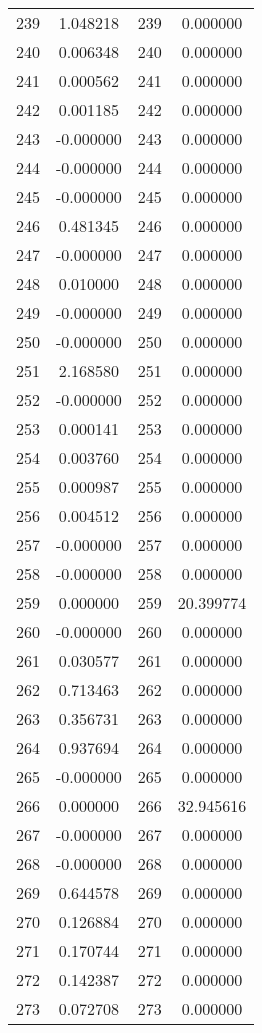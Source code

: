 \documentclass[12pt]{article}
\begin{document}
\begin{longtable}{@{}cccc@{}}
239 & 1.048218 & 239 & 0.000000 \\
240 & 0.006348 & 240 & 0.000000 \\
241 & 0.000562 & 241 & 0.000000 \\
242 & 0.001185 & 242 & 0.000000 \\
243 & -0.000000 & 243 & 0.000000 \\
244 & -0.000000 & 244 & 0.000000 \\
245 & -0.000000 & 245 & 0.000000 \\
246 & 0.481345 & 246 & 0.000000 \\
247 & -0.000000 & 247 & 0.000000 \\
248 & 0.010000 & 248 & 0.000000 \\
249 & -0.000000 & 249 & 0.000000 \\
250 & -0.000000 & 250 & 0.000000 \\
251 & 2.168580 & 251 & 0.000000 \\
252 & -0.000000 & 252 & 0.000000 \\
253 & 0.000141 & 253 & 0.000000 \\
254 & 0.003760 & 254 & 0.000000 \\
255 & 0.000987 & 255 & 0.000000 \\
256 & 0.004512 & 256 & 0.000000 \\
257 & -0.000000 & 257 & 0.000000 \\
258 & -0.000000 & 258 & 0.000000 \\
259 & 0.000000 & 259 & 20.399774 \\
260 & -0.000000 & 260 & 0.000000 \\
261 & 0.030577 & 261 & 0.000000 \\
262 & 0.713463 & 262 & 0.000000 \\
263 & 0.356731 & 263 & 0.000000 \\
264 & 0.937694 & 264 & 0.000000 \\
265 & -0.000000 & 265 & 0.000000 \\
266 & 0.000000 & 266 & 32.945616 \\
267 & -0.000000 & 267 & 0.000000 \\
268 & -0.000000 & 268 & 0.000000 \\
269 & 0.644578 & 269 & 0.000000 \\
270 & 0.126884 & 270 & 0.000000 \\
271 & 0.170744 & 271 & 0.000000 \\
272 & 0.142387 & 272 & 0.000000 \\
273 & 0.072708 & 273 & 0.000000 \\

\end{longtable}
\end{document}
